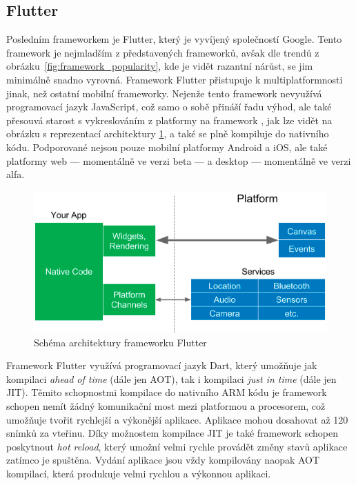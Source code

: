 \subsection{Flutter}

Posledním frameworkem je Flutter,
který je vyvíjený společností Google.
Tento framework je nejmladším z představených frameworků,
avšak dle trendů z obrázku~\ref{fig:framework_popularity},
kde je vidět razantní nárůst,
se jim minimálně snadno vyrovná.
Framework Flutter přistupuje k multiplatformnosti jinak,
než ostatní mobilní frameworky.
Nejenže tento framework nevyužívá programovací jazyk JavaScript,
což samo o sobě přináší řadu výhod,
ale také přesouvá starost s vykreslováním z platformy na framework
\cite{hackernoon_flutter},
jak lze vidět na obrázku s reprezentací architektury
\ref{fig:framework_flutter},
a také se plně kompiluje do nativního kódu.
\cite{dashmagazine_mobile_frameworks}
Podporované nejsou pouze mobilní platformy Android a iOS,
ale také platformy web
--- momentálně ve verzi beta ---
a desktop
--- momentálně ve verzi alfa.

\begin{figure}[ht!]
    \centering
    \includegraphics[width=\linewidth]{assets/technology-research/framework/flutter.png}
    \caption{Schéma architektury frameworku Flutter
    ~\cite{hackernoon_flutter}}
    \label{fig:framework_flutter}
\end{figure}

Framework Flutter využívá programovací jazyk Dart,
který umožňuje jak kompilaci \emph{ahead of time} (dále jen AOT),
tak i kompilaci \emph{just in time} (dále jen JIT).
\cite{hackernoon_flutter}
Těmito schopnostmi kompilace do nativního ARM kódu je framework schopen
nemít žádný komunikační most mezi platformou a procesorem,
což umožňuje tvořit rychlejší a výkonější aplikace.
Aplikace mohou dosahovat až 120 snímků za vteřinu.
\cite{dashmagazine_mobile_frameworks}
Díky možnostem kompilace JIT je také framework schopen poskytnout
\emph{hot reload},
který umožní velmi rychle provádět změny stavů aplikace zatímco je spuštěna.
Vydání aplikace jsou vždy kompilovány naopak AOT kompilací,
která produkuje velmi rychlou a výkonnou aplikaci.
\cite{hackernoon_flutter}

